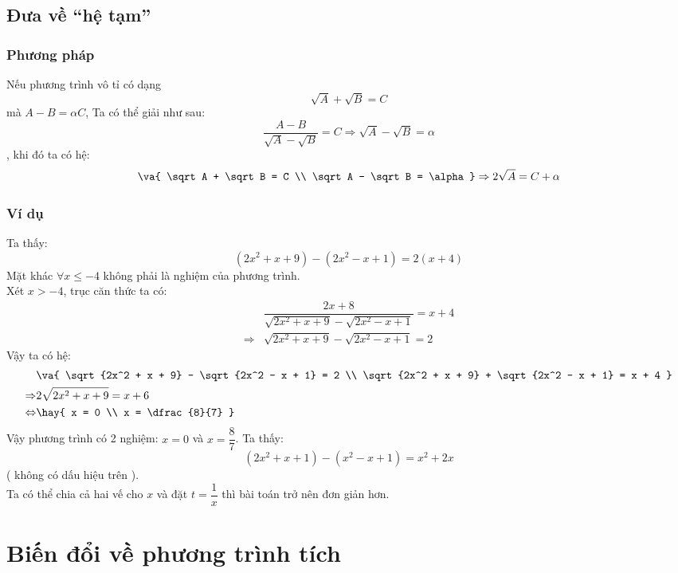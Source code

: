 \subsection{ Đưa về “hệ tạm”}
\subsubsection{ Phương pháp }
Nếu phương trình vô tỉ có dạng 
$$\sqrt A + \sqrt B = C$$ mà 
$A - B = \alpha C$, 
Ta có thể giải như sau:
$$\dfrac{{A - B}}{{\sqrt A - \sqrt B }} = C \Rightarrow \sqrt A - \sqrt B = \alpha $$, khi đó ta có hệ: $$\va{
 \sqrt A + \sqrt B = C \\ 
 \sqrt A - \sqrt B = \alpha } \Rightarrow 2\sqrt A = C + \alpha $$
\subsubsection{ Ví dụ }
\lgi
Ta thấy:  $$\left( {2x^2 + x + 9} \right) - \left( {2x^2 - x + 1} \right) = 2\left( {x + 4} \right)$$
Mặt khác $\forall x \leq -4$ không phải là nghiệm của phương trình.\\
Xét $x > - 4$, trục căn thức ta có:  
\begin{align*}
& \dfrac{{2x + 8}}{{\sqrt {2x^2 + x + 9} - \sqrt {2x^2 - x + 1} }} = x + 4 \\
\Rightarrow & \sqrt {2x^2 + x + 9} - \sqrt {2x^2 - x + 1} = 2
\end{align*}
Vậy ta có hệ: 
\begin{align*}
& \va{ \sqrt {2x^2 + x + 9} - \sqrt {2x^2 - x + 1} = 2 \\ \sqrt {2x^2 + x + 9} + \sqrt {2x^2 - x + 1} = x + 4 } \\
  \Rightarrow & 2\sqrt {2x^2 + x + 9} = x + 6 \\
  \Leftrightarrow & \hay{
 x = 0 \\ 
 x = \dfrac{8}{7} }
\end{align*}
Vậy phương trình có 2 nghiệm:  $x = 0$ và $x =\dfrac{8}{7}$.
\hda
Ta thấy:  
$$\left( {2x^2 + x + 1} \right) - \left( {x^2 - x + 1} \right) = x^2 + 2x$$
( không có dấu hiệu trên ).\\
Ta có thể chia cả hai vế cho $x$ và đặt $t = \dfrac{1}{x}$ thì bài toán trở nên đơn giản hơn.
\section{ Biến đổi về phương trình tích }
